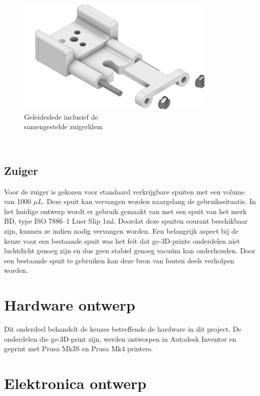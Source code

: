 \begin{minipage}[t]{0.59\textwidth}
    \vspace{0pt}
    \begin{figure}[H]
        \centering
        \includegraphics[width=0.85\textwidth]{figures/CarriageAndClamp.png}
        \caption{Geleideslede inclusief de \\samengestelde zuigerklem}\label{fig:CarriageAndClamp}
    \end{figure}
\end{minipage}\\

\subsection{Zuiger}
Voor de zuiger is gekozen voor standaard verkrijgbare spuiten met een volume van 1000 $\mu L$. Deze spuit kan vervangen worden naargelang de gebruikssituatie. In het huidige ontwerp wordt er gebruik gemaakt van met een spuit van het merk BD, type ISO 7886--1 Luer Slip 1ml. Doordat deze spuiten courant beschikbaar zijn, kunnen ze indien nodig vervangen worden.
Een belangrijk aspect bij de keuze voor een bestaande spuit was het feit dat ge-3D-printe onderdelen niet luchtdicht genoeg zijn en dus geen stabiel genoeg vacuüm kan onderhouden. Door een bestaande spuit te gebruiken kan deze bron van fouten deels verholpen worden.


\section{Hardware ontwerp}
Dit onderdeel behandelt de keuzes betreffende de hardware in dit project. De onderdelen die ge-3D-print zijn, werden ontworpen in Autodesk Inventor en geprint met Prusa Mk3S en Prusa Mk4 printers.

\section{Elektronica ontwerp}
